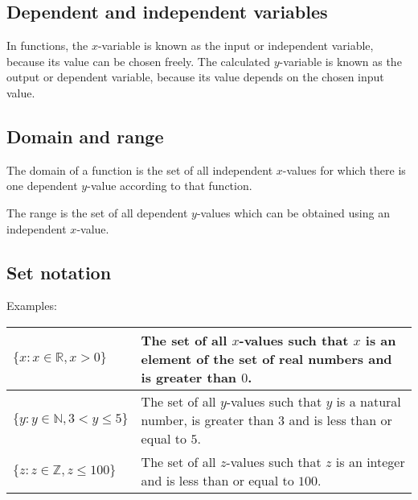 \par
{}


\subsection*{Dependent and independent variables}
In functions, the $x$-variable is known as the input or independent variable, because its value can be chosen freely. The calculated $y$-variable is known as the output or dependent variable, because its value depends on the chosen input value.\par 

\subsection*{Domain and range}

The domain of a function is the set of all independent $x$-values for
which there is one dependent $y$-value according to that function.

The range is the set of all dependent $y$-values which can be obtained
using an independent $x$-value.


\subsection*{Set notation}
Examples:
\\
\begin{table}[H]
\begin{tabular}{|p{5cm}|p{8cm}|}
\hline
  $\{x: x \in \mathbb{R}, x > 0\}$ &  The set of all $x$-values such that $x$ is an element of the set of real numbers and is greater than $0$.
\\ \hline
    $\{y: y \in \mathbb{N}, 3 < y \leq 5\}$ & The set of all
    $y$-values such that $y$ is a natural number, is greater than
    $3$ and is less than or equal to $5$.
\\ \hline
  $\{z: z \in \mathbb{Z}, z \leq 100\}$ & The set of all $z$-values such that $z$ is an integer and is less than or equal to $100$.  
\\ \hline
\end{tabular}
\end{table}
